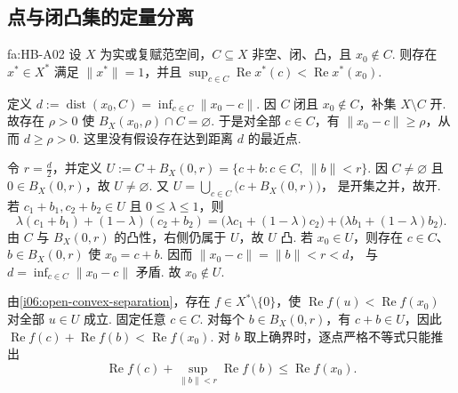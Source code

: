 \newpage
\subsection{点与闭凸集的定量分离}

\begin{FATheorem}[A][凸集分离定理]{fa:HB-A02}
设 \(\displaystyle X\) 为实或复赋范空间，\(\displaystyle C\subseteq X\) 非空、闭、凸，且 \(\displaystyle x_0\notin C\). 则存在 \(\displaystyle x^*\in X^*\) 满足 \(\displaystyle \|x^*\|=1\)，并且 \(\displaystyle \sup_{c\in C}\operatorname{Re}x^*(c) < \operatorname{Re}x^*(x_0)\).
\end{FATheorem}

\begin{FAProof}
定义 \(\displaystyle d:=\operatorname{dist}(x_0,C) =\inf_{c\in C}\|x_0-c\|\).
因 \(\displaystyle C\) 闭且 \(\displaystyle x_0\notin C\)，补集 \(\displaystyle X\setminus C\) 开. 故存在 \(\displaystyle \rho>0\) 使 \(\displaystyle B_X(x_0,\rho)\cap C=\varnothing\).
于是对全部 \(\displaystyle c\in C\)，有 \(\displaystyle \|x_0-c\|\geqslant\rho\)，从而 \(\displaystyle d\geqslant\rho>0\).
这里没有假设存在达到距离 \(\displaystyle d\) 的最近点.

令 \(\displaystyle r=\frac{d}{2}\)，并定义 \(\displaystyle U:=C+B_X(0,r) =\{c+b:c\in C,\ \|b\|<r\}\).
因 \(\displaystyle C\neq\varnothing\) 且 \(\displaystyle0\in B_X(0,r)\)，故 \(\displaystyle U\neq\varnothing\). 又 \(\displaystyle U=\bigcup_{c\in C}\bigl(c+B_X(0,r)\bigr)\)，
是开集之并，故开. 若 \(\displaystyle c_1+b_1,c_2+b_2\in U\) 且 \(\displaystyle0\leqslant\lambda\leqslant1\)，则
\[
\lambda(c_1+b_1)+(1-\lambda)(c_2+b_2)
=\bigl(\lambda c_1+(1-\lambda)c_2\bigr)
+\bigl(\lambda b_1+(1-\lambda)b_2\bigr).
\]
由 \(\displaystyle C\) 与 \(\displaystyle B_X(0,r)\) 的凸性，右侧仍属于 \(\displaystyle U\)，故 \(\displaystyle U\) 凸. 若 \(\displaystyle x_0\in U\)，则存在 \(\displaystyle c\in C\)、\(\displaystyle b\in B_X(0,r)\) 使 \(\displaystyle x_0=c+b\). 因而 \(\displaystyle \|x_0-c\|=\|b\|<r<d\)，
与 \(\displaystyle d=\inf_{c\in C}\|x_0-c\|\) 矛盾. 故 \(\displaystyle x_0\notin U\).

由\autoref{i06:open-convex-separation}，存在 \(\displaystyle f\in X^*\setminus\{0\}\)，使 \(\displaystyle \operatorname{Re}f(u)<\operatorname{Re}f(x_0)\)
对全部 \(\displaystyle u\in U\) 成立. 固定任意 \(\displaystyle c\in C\). 对每个 \(\displaystyle b\in B_X(0,r)\)，有 \(\displaystyle c+b\in U\)，因此 \(\displaystyle \operatorname{Re}f(c)+\operatorname{Re}f(b) < \operatorname{Re}f(x_0)\).
对 \(\displaystyle b\) 取上确界时，逐点严格不等式只能推出
\[
\operatorname{Re}f(c)
+
\sup_{\|b\|<r}\operatorname{Re}f(b)
\leqslant
\operatorname{Re}f(x_0).
\]


\end{FAProof}

